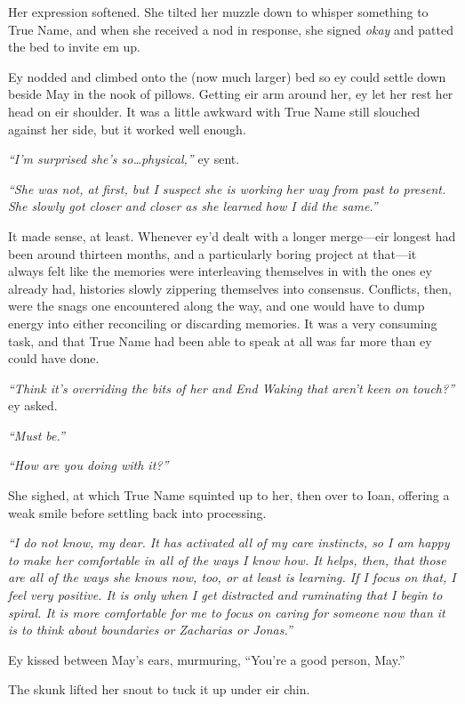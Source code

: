 Her expression softened. She tilted her muzzle down to whisper something to True Name, and when she received a nod in response, she signed \emph{okay} and patted the bed to invite em up.

Ey nodded and climbed onto the (now much larger) bed so ey could settle down beside May in the nook of pillows. Getting eir arm around her, ey let her rest her head on eir shoulder. It was a little awkward with True Name still slouched against her side, but it worked well enough.

\emph{``I'm surprised she's so\ldots physical,''} ey sent.

\emph{``She was not, at first, but I suspect she is working her way from past to present. She slowly got closer and closer as she learned how I did the same.''}

It made sense, at least. Whenever ey'd dealt with a longer merge—eir longest had been around thirteen months, and a particularly boring project at that—it always felt like the memories were interleaving themselves in with the ones ey already had, histories slowly zippering themselves into consensus. Conflicts, then, were the snags one encountered along the way, and one would have to dump energy into either reconciling or discarding memories. It was a very consuming task, and that True Name had been able to speak at all was far more than ey could have done.

\emph{``Think it's overriding the bits of her and End Waking that aren't keen on touch?''} ey asked.

\emph{``Must be.''}

\emph{``How are you doing with it?''}

She sighed, at which True Name squinted up to her, then over to Ioan, offering a weak smile before settling back into processing.

\emph{``I do not know, my dear. It has activated all of my care instincts, so I am happy to make her comfortable in all of the ways I know how. It helps, then, that those are all of the ways she knows now, too, or at least is learning. If I focus on that, I feel very positive. It is only when I get distracted and ruminating that I begin to spiral. It is more comfortable for me to focus on caring for someone now than it is to think about boundaries or Zacharias or Jonas.''}

Ey kissed between May's ears, murmuring, ``You're a good person, May.''

The skunk lifted her snout to tuck it up under eir chin.

